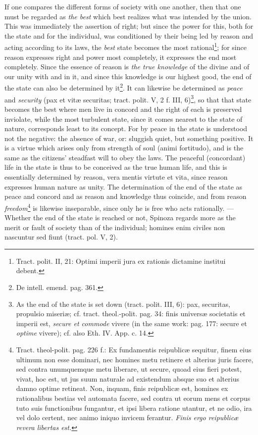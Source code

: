 \documentclass[12pt,a4paper,openany]{book}
\newcommand{\opage}[1]{\marginnote{\footnotesize\textit{[#1]}}}
\begin{document}
If one compares the different forms of society with one another, then that one must be regarded as \emph{the best} which best realizes what was intended by the union. This was immediately the assertion of right; but since the power for this, both for the state and for the individual, was conditioned by their being led by reason and acting according to its laws, the \emph{best} state becomes the most rational\footnote{Tract. polit. II, 21: Optimi imperii jura ex rationis dictamine institui debent.}; for since reason expresses right and power most completely, it expresses the end most completely. Since the essence of reason is \emph{the true knowledge} of the divine and of our unity with and in it, and since this knowledge is our highest good, the end of the state can also be determined by it\footnote{De intell. emend. pag. 361.}. It can likewise be determined as \emph{peace} and \emph{security} (pax et vitæ securitas; tract. polit. V, 2 f. III, 6)\footnote{As the end of the state is set down (tract. polit. III, 6): pax, securitas, propulsio miseriæ; cf. tract. theol.-polit. pag. 34: finis universæ societatis et imperii est, \emph{secure et commode} vivere (in the same work: pag. 177: secure et \emph{optime} vivere); cf. also Eth. IV. App. c. 14.}, so that
\opage{143}\setcounter{footnote}{0}that state becomes the best where men live in concord and the right of each is preserved inviolate, while the most turbulent state, since it comes nearest to the state of nature, corresponds least to its concept. For by peace in the state is understood not the negative: the absence of war, or: sluggish quiet, but something positive. It is a virtue which arises only from strength of soul (animi fortitudo), and is the same as the citizens' steadfast will to obey the laws. The peaceful (concordant) life in the state is thus to be conceived as the true human life, and this is essentially determined by reason, vera mentis virtute et vita, since reason expresses human nature as unity. The determination of the end of the state as peace and concord and as reason and knowledge thus coincide, and from reason \emph{freedom}\footnote{Tract. theol-polit. pag. 226 f.: Ex fundamentis reipublicæ sequitur, finem eius ultimum non esse dominari, nec homines metu retinere et alterius juris facere, sed contra unumquemque metu liberare, ut secure, quoad eius fieri potest, vivat, hoc est, ut jus suum naturale ad existendum absque suo et alterius damno optime retineat. Non, inquam, finis reipublicæ est, homines ex rationalibus bestias vel automata facere, sed contra ut eorum mens et corpus tuto suis functionibus fungantur, et ipsi libera ratione utantur, et ne odio, ira vel dolo certent, nec animo iniquo invicem ferantur. \emph{Finis ergo reipublicæ revera libertas est.}} is likewise inseparable, since only he is free who acts rationally. --- Whether the end of the state is reached or not, Spinoza regards more as the merit or fault of society than of the individual; homines enim civiles non nascuntur sed fiunt (tract. pol. V, 2). %
\end{document}
